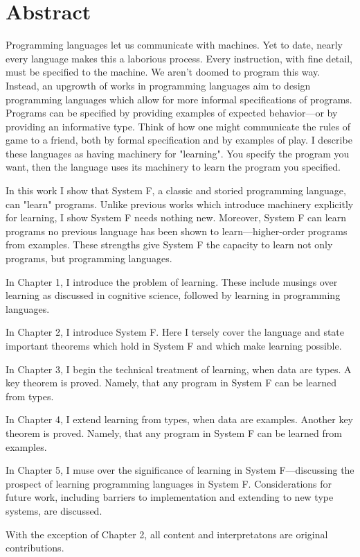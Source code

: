 \section*{\huge Abstract}

Programming languages let us communicate with machines. Yet to date, nearly every language makes this a laborious process. Every instruction, with fine detail, must be specified to the machine. We aren't doomed to program this way. Instead, an upgrowth of works in programming languages aim to design programming languages which allow for more informal specifications of programs. Programs can be specified by providing examples of expected behavior---or by providing an informative type. Think of how one might communicate the rules of game to a friend, both by formal specification and by examples of play. I describe these languages as having machinery for "learning". You specify the program you want, then the language uses its machinery to learn the program you specified. 

In this work I show that System F, a classic and storied programming language, can "learn" programs. Unlike previous works which introduce machinery explicitly for learning, I show System F needs nothing new. Moreover, System F can learn programs no previous language has been shown to learn---higher-order programs from examples. These strengths give System F the capacity to learn not only programs, but programming languages.

In Chapter 1, I introduce the problem of learning. These include musings over learning as discussed in cognitive science, followed by learning in programming languages. 

In Chapter 2, I introduce System F. Here I tersely cover the language and state important theorems which hold in System F and which make learning possible.

In Chapter 3, I begin the technical treatment of learning, when data are types. A key theorem is proved. Namely, that any program in System F can be learned from types.

In Chapter 4, I extend learning from types, when data are examples. Another key theorem is proved. Namely, that any program in System F can be learned from examples.

In Chapter 5, I muse over the significance of learning in System F---discussing the prospect of learning programming languages in System F. Considerations for future work, including barriers to implementation and extending to new type systems, are discussed. 

With the exception of Chapter 2, all content and interpretatons are original contributions.